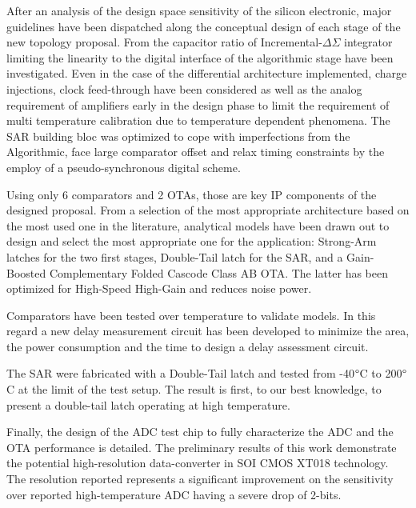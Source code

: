 After an analysis of the design space sensitivity of the silicon electronic, major guidelines have been dispatched along the conceptual design of each stage of the new topology proposal. From the capacitor ratio of Incremental-\(\Delta \Sigma\) integrator limiting the linearity to the digital interface of the algorithmic stage have been investigated. Even in the case of the differential architecture implemented, charge injections, clock feed-through have been considered as well as the analog requirement of amplifiers early in the design phase to limit the requirement of multi temperature calibration due to temperature dependent phenomena. The SAR building bloc was optimized to cope with imperfections from the Algorithmic, face large comparator offset and relax timing constraints by the employ of a pseudo-synchronous digital scheme.

Using only 6 comparators and 2 OTAs, those are key IP components of the designed proposal. From a selection of the most appropriate architecture based on the most used one in the literature, analytical models have been drawn out to design and select the most appropriate one for the application: Strong-Arm latches for the two first stages, Double-Tail latch for the SAR, and a Gain-Boosted Complementary Folded Cascode Class AB OTA\@. The latter has been optimized for High-Speed High-Gain and reduces noise power.

Comparators have been tested over temperature to validate models. In this regard a new delay measurement circuit has been developed to minimize the area, the power consumption and the time to design a delay assessment circuit.

The SAR were fabricated with a Double-Tail latch and tested from -40$\degree$C to 200$\degree$C at the limit of the test setup. The result is first, to our best knowledge, to present a double-tail latch operating at high temperature.

Finally, the design of the ADC test chip to fully characterize the ADC and the OTA performance is detailed. The preliminary results of this work demonstrate the potential high-resolution data-converter in SOI CMOS XT018 technology. The resolution reported represents a significant improvement on the sensitivity over reported high-temperature ADC having a severe drop of 2-bits.


